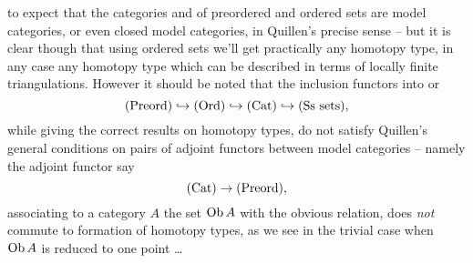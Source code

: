 to expect that the categories \Preord{} and \Ord{} of preordered and
ordered sets are model categories, or even closed model categories, in
Quillen's precise sense -- but it is clear though that using ordered
sets we'll get practically any homotopy type, in any case any homotopy
type which can be described in terms of locally finite
triangulations. However it should be noted that the inclusion functors
into \Cat{} or \Sssets
\[ {(\mathrm{Preord})} \hookrightarrow {\ensuremath{(\mathrm{Ord})}} \hookrightarrow
{\ensuremath{(\mathrm{Cat})}} \hookrightarrow {\ensuremath{(\mathrm{Ss~sets})}},\]
while giving the correct results on homotopy types, do not satisfy
Quillen's general conditions on pairs of adjoint functors between
model categories -- namely the adjoint functor say
\[ {(\mathrm{Cat})} \to {\ensuremath{(\mathrm{Preord})}}, \]
associating to a category $A$ the set $\operatorname{Ob} A$ with the obvious
relation, does \emph{not} commute to formation of homotopy types, as
we see in the trivial case when $\operatorname{Ob} A$ is reduced to one point \ldots

